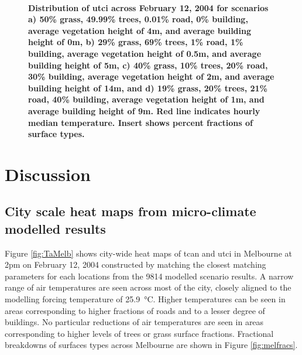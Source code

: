\documentclass[final,3p,times,authoryear]{elsarticle}
\begin{document}
 
\begin{figure}
\centering
{}
\\
\caption{\bf Distribution of \gls{utci} across February 12, 2004 for scenarios a) 50\% grass, 49.99\% trees, 0.01\% road, 0\% building, average vegetation height of 4m, and average building height of 0m, b) 29\% grass, 69\% trees, 1\% road, 1\% building, average vegetation height of 0.5m, and average building height of 5m, c) 40\% grass, 10\% trees, 20\% road, 30\% building, average vegetation height of 2m, and average building height of 14m, and d) 19\% grass, 20\% trees, 21\% road, 40\% building, average vegetation height of 1m, and average building height of 9m. Red line indicates hourly median temperature. Insert shows percent fractions of surface types.}
 \label{fig:dist1}
\end{figure}





\section{Discussion}\label{sec:discussion}








\subsection{City scale heat maps from micro-climate modelled results}\label{sec:resultsheatmaps}




Figure \ref{fig:TaMelb} shows city-wide heat maps of \gls{tcan} and \gls{utci} in Melbourne at 2pm on February 12, 2004 constructed by matching the closest matching parameters for each locations from the 9814 modelled scenario results. A narrow range of air temperatures are seen across most of the city, closely aligned to the modelling forcing temperature of 25.9\SI{}{\degreeCelsius}. Higher temperatures can be seen in areas corresponding to higher fractions of roads and to a lesser degree of buildings. No particular reductions of air temperatures are seen in areas corresponding to higher levels of trees or grass surface fractions. Fractional breakdowns of surfaces types across Melbourne are shown in Figure \ref{fig:melfracs}. 
\end{document}
